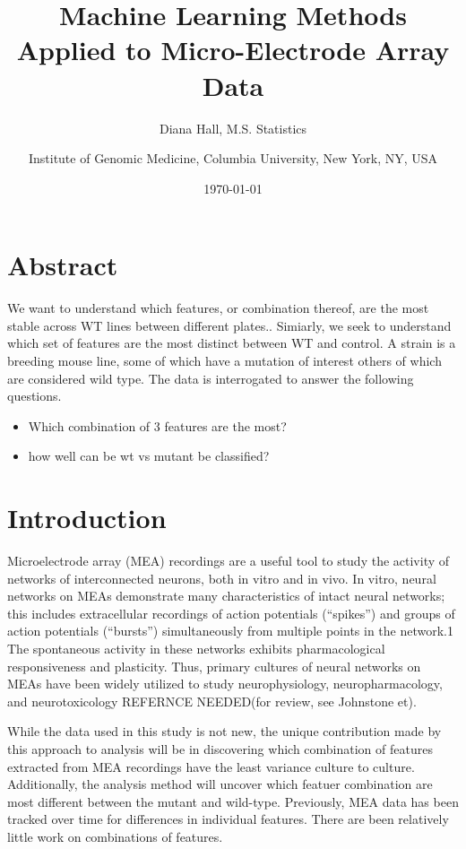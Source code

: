 \documentclass{article}\usepackage[]{graphicx}\usepackage[]{color}
\begin{document}

\onehalfspacing
\title{Machine Learning Methods Applied to Micro-Electrode Array Data }

\author{Diana Hall, M.S. Statistics }
\author{Institute of Genomic Medicine, Columbia University, New York, NY, USA }
\date{\today}

\maketitle

\section*{Abstract}
We want to understand which features, or combination thereof, are the most stable across WT lines between different plates.. Simiarly, we seek to understand which set of features are the most distinct between WT and control. A strain is a breeding mouse line, some of which have a mutation of interest others of which are considered wild type.  The data is interrogated to answer the following questions. 
\begin{itemize}
\item Which combination of 3 features are the most?
\item how well can be wt vs mutant be classified?
\end{itemize}

\section{ Introduction }
Microelectrode array (MEA) recordings are a useful tool to study the activity of networks of interconnected neurons, both in vitro and in vivo. In vitro, neural networks on MEAs demonstrate many characteristics of intact neural networks; this includes extracellular recordings of action potentials (“spikes”) and groups of action potentials (“bursts”) simultaneously from multiple points in the network.1 The spontaneous activity in these networks exhibits pharmacological responsiveness and plasticity. Thus, primary cultures of neural networks on MEAs have been widely utilized to study neurophysiology, neuropharmacology, and neurotoxicology REFERNCE NEEDED(for review, see Johnstone et). 

While the data used in this study is not new, the unique contribution made by this approach to analysis will be in discovering which combination of features extracted from MEA recordings have the least variance culture to culture. Additionally, the analysis method will uncover which featuer combination are most different between the mutant and wild-type.  Previously, MEA data has been tracked over time for differences in individual features. There are been relatively little work on combinations of features.
\end{document}
